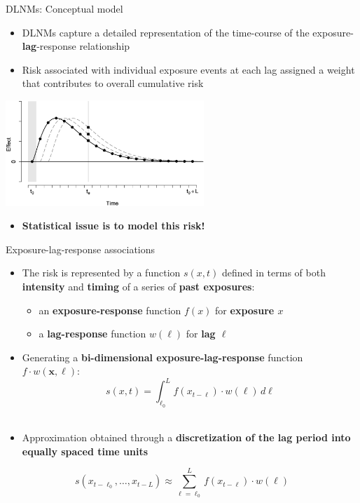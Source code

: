 \documentclass[english]{beamer}
\newcommand{\alertblue}[1]{{\color{blue}#1}}
\begin{document}
\begin{frame}{DLNMs: Conceptual model}
    \begin{itemize}
        \item DLNMs capture a detailed representation of the \alertblue{time-course} of the \alertblue{exposure-\textbf{lag}-response relationship} 
         \item Risk associated with individual exposure events at each lag \alertblue{assigned a weight} that contributes to \alertblue{overall cumulative risk}
  \end{itemize}  
    \centering
    \includegraphics[width=7.5cm,keepaspectratio]{images/delayed effect.png}
  \begin{itemize}
      \item \textbf{\alertblue{Statistical issue is to model this risk!}}
  \end{itemize} 
\end{frame}
\begin{frame}{Exposure-lag-response associations }
    \begin{itemize}
        \item The risk is represented by a function \alertblue{$s(x, t)$} defined in terms of both \textbf{\alertblue{intensity}} and \textbf{\alertblue{timing}} of a series of \textbf{\alertblue{past exposures}}:
        \vspace{0.1cm}
        \begin{itemize}
            \item an \textbf{\alertblue{exposure-response}} function \alertblue{$f(x)$} for \textbf{\alertblue{exposure $x$}}
            \item a \textbf{\alertblue{lag-response}} function \alertblue{$w(\ell)$} for \textbf{\alertblue{lag $\ell$}}
        \end{itemize}
        \vspace{0.1cm}
        \item Generating a \textbf{\alertblue{bi-dimensional exposure-lag-response}} function 
        \alertblue{\( f \cdot w(\bm{x}, \ell) \)}: \\
        \[
        s(x, t) = \int_{\ell_0}^{L} f(x_{t-\ell}) \cdot w(\ell) \, d\ell \] \\
        \end{itemize}
    \begin{itemize}
        \item Approximation obtained through a \textbf{\alertblue{discretization of the lag period into equally spaced time units}}
    \end{itemize}
        \[
        s(x_{t-\ell_0}, \dots, x_{t-L}) \approx \sum_{\ell = \ell_0}^{L} f(x_{t-\ell}) \cdot w( \ell)
        \]
\end{frame}
\end{document}
